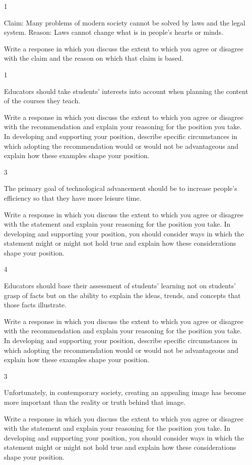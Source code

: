 \documentclass[]{article}
\begin{document}
1

Claim: Many problems of modern society cannot be solved by laws and the
legal system. Reason: Laws cannot change what is in people's hearts or
minds.

Write a response in which you discuss the extent to which you agree or
disagree with the claim and the reason on which that claim is based.

1

Educators should take students' interests into account when planning the
content of the courses they teach.

Write a response in which you discuss the extent to which you agree or
disagree with the recommendation and explain your reasoning for the
position you take. In developing and supporting your position, describe
specific circumstances in which adopting the recommendation would or
would not be advantageous and explain how these examples shape your
position.

3

The primary goal of technological advancement should be to increase
people's efficiency so that they have more leisure time.

Write a response in which you discuss the extent to which you agree or
disagree with the statement and explain your reasoning for the position
you take. In developing and supporting your position, you should
consider ways in which the statement might or might not hold true and
explain how these considerations shape your position.

4

Educators should base their assessment of students' learning not on
students' grasp of facts but on the ability to explain the ideas,
trends, and concepts that those facts illustrate.

Write a response in which you discuss the extent to which you agree or
disagree with the recommendation and explain your reasoning for the
position you take. In developing and supporting your position, describe
specific circumstances in which adopting the recommendation would or
would not be advantageous and explain how these examples shape your
position.

3

Unfortunately, in contemporary society, creating an appealing image has
become more important than the reality or truth behind that image.

Write a response in which you discuss the extent to which you agree or
disagree with the statement and explain your reasoning for the position
you take. In developing and supporting your position, you should
consider ways in which the statement might or might not hold true and
explain how these considerations shape your position.
\end{document}
